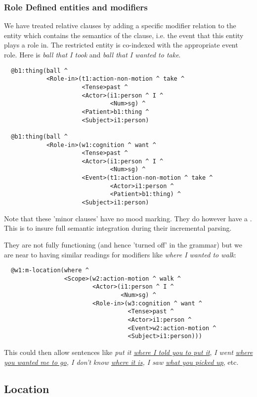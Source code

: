 \subsubsection{Role Defined entities and modifiers}
We have treated relative clauses by adding a specific modifier relation  to the entity which contains the semantics of the clause, i.e. the event that this entity plays a role in. The restricted entity is co-indexed with the appropriate event role. Here is \emph{ball that I took} and \emph{ball that I wanted to take}.
\begin{verbatim}
  @b1:thing(ball ^ 
            <Role-in>(t1:action-non-motion ^ take ^ 
                      <Tense>past ^ 
                      <Actor>(i1:person ^ I ^ 
                              <Num>sg) ^ 
                      <Patient>b1:thing ^ 
                      <Subject>i1:person)

  @b1:thing(ball ^ 
            <Role-in>(w1:cognition ^ want ^ 
                      <Tense>past ^ 
                      <Actor>(i1:person ^ I ^ 
                              <Num>sg) ^ 
                      <Event>(t1:action-non-motion ^ take ^ 
                              <Actor>i1:person ^ 
                              <Patient>b1:thing) ^ 
                      <Subject>i1:person)
\end{verbatim}                                            
Note that these 'minor clauses' have no mood marking. They do however have a . This is to insure full semantic integration during their incremental parsing.

They are not fully functioning (and hence 'turned off' in the grammar) but we are near to having similar readings for modifiers like \emph{where I wanted to walk}:
\begin{verbatim}
  @w1:m-location(where ^ 
                 <Scope>(w2:action-motion ^ walk ^ 
                         <Actor>(i1:person ^ I ^ 
                                 <Num>sg) ^ 
                         <Role-in>(w3:cognition ^ want ^ 
                                   <Tense>past ^ 
                                   <Actor>i1:person ^ 
                                   <Event>w2:action-motion ^ 
                                   <Subject>i1:person)))
\end{verbatim}
This could then allow sentences like \emph{put it \ul{where I told you to put it}}, \emph{I went \ul{where you wanted me to go}, I don't know \ul{where it is}, I saw \ul{what you picked up}}, etc. 
\subsection{Location}


